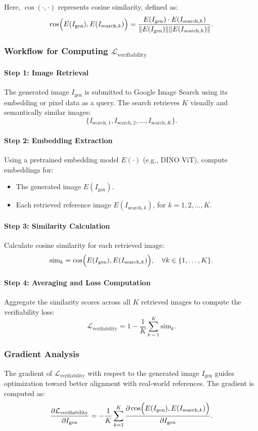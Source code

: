 Here, \(\cos(\cdot, \cdot)\) represents cosine similarity, defined as:
\[
\cos\Bigl(E(I_{\text{gen}}), E(I_{\text{search},k})\Bigr) = \frac{E(I_{\text{gen}}) \cdot E(I_{\text{search},k})}{\|E(I_{\text{gen}})\| \|E(I_{\text{search},k})\|}.
\]


\subsubsection{Workflow for Computing \(\mathcal{L}_{\text{verifiability}}\)}
\paragraph{Step 1: Image Retrieval}
The generated image \(I_{\text{gen}}\) is submitted to Google Image Search using its embedding or pixel data as a query. The search retrieves \(K\) visually and semantically similar images:
\[
\{I_{\text{search},1}, I_{\text{search},2}, \dots, I_{\text{search},K}\}.
\]

\paragraph{Step 2: Embedding Extraction}
Using a pretrained embedding model \(E(\cdot)\) (e.g., DINO ViT), compute embeddings for:
\begin{itemize}
    \item The generated image \(E(I_{\text{gen}})\).
    \item Each retrieved reference image \(E(I_{\text{search},k})\), for \(k = 1, 2, \dots, K\).
\end{itemize}

\paragraph{Step 3: Similarity Calculation}
Calculate cosine similarity for each retrieved image:
\[
\text{sim}_{k} = \cos\Bigl(E(I_{\text{gen}}), E(I_{\text{search},k})\Bigr), \quad \forall k \in \{1, \dots, K\}.
\]

\paragraph{Step 4: Averaging and Loss Computation}
Aggregate the similarity scores across all \(K\) retrieved images to compute the verifiability loss:
\[
\mathcal{L}_{\text{verifiability}}
=
1 - \frac{1}{K} \sum_{k=1}^K \text{sim}_{k}.
\]


\subsubsection{Gradient Analysis}
The gradient of \(\mathcal{L}_{\text{verifiability}}\) with respect to the generated image \(I_{\text{gen}}\) guides optimization toward better alignment with real-world references. The gradient is computed as:
\[
\frac{\partial \mathcal{L}_{\text{verifiability}}}{\partial I_{\text{gen}}}
=
- \frac{1}{K} \sum_{k=1}^K
\frac{\partial \cos\Bigl(E(I_{\text{gen}}), E(I_{\text{search},k})\Bigr)}{\partial I_{\text{gen}}}.
\]


